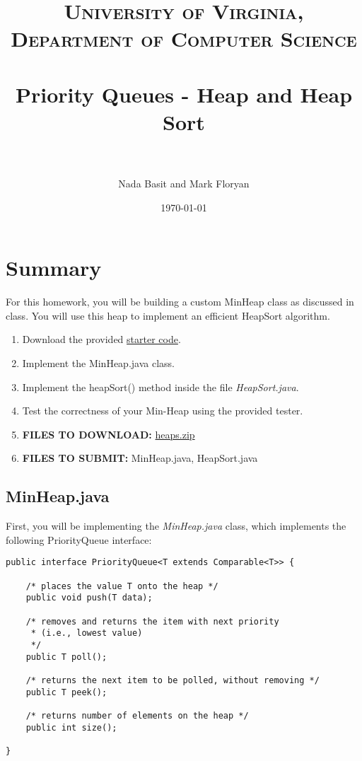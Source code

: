 \documentclass[paper=a4, fontsize=11pt, parskip=full]{scrartcl} %
\title{
\normalfont \normalsize
\textsc{University of Virginia, Department of Computer Science} \\ [25pt] %
\horrule{0.5pt} \\[0.4cm] %
\huge Priority Queues - Heap and Heap Sort \\ %
\horrule{2pt} \\[0.5cm] %
}
\author{Nada Basit and Mark Floryan}
\date{\normalsize\today} %
\numberwithin{equation}{section} %
\numberwithin{figure}{section} %
\numberwithin{table}{section} %
\begin{document}
\maketitle %


\section{Summary}

For this homework, you will be building a custom MinHeap class as discussed in class. You will use this heap to implement an efficient HeapSort algorithm. 

\begin{enumerate}
	\item Download the provided \href{https://uva-cs.github.io/dsa1/homeworks/PriorityQueues/code/heaps.zip}{starter code}.
	\item Implement the MinHeap.java class.
	\item Implement the heapSort() method inside the file \emph{HeapSort.java}.
	\item Test the correctness of your Min-Heap using the provided tester.
	\item \textbf{FILES TO DOWNLOAD:} \href{https://uva-cs.github.io/dsa1/homeworks/PriorityQueues/code/heaps.zip}{heaps.zip}
	\item \textbf{FILES TO SUBMIT:} MinHeap.java, HeapSort.java
\end{enumerate}


\subsection{MinHeap.java}

First, you will be implementing the \emph{MinHeap.java} class, which implements the following PriorityQueue interface:

\begin{lstlisting}
public interface PriorityQueue<T extends Comparable<T>> {
	
	/* places the value T onto the heap */
	public void push(T data);

	/* removes and returns the item with next priority
     * (i.e., lowest value)
	 */
	public T poll();

	/* returns the next item to be polled, without removing */
	public T peek();

	/* returns number of elements on the heap */
	public int size();
	
}
\end{lstlisting}
\end{document}
